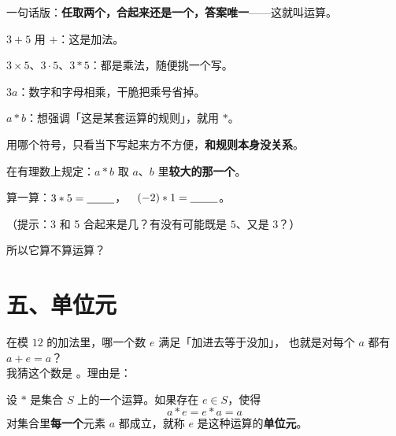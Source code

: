 \noindent 一句话版：\textbf{任取两个，合起来还是一个，答案唯一}——这就叫运算。

\begin{example}
  \(3+5\) 用 \(+\)：这是加法。

  \(3\times5\)、\(3\cdot5\)、\(3*5\)：都是乘法，随便挑一个写。

  \(3a\)：数字和字母相乘，干脆把乘号省掉。

  \(a*b\)：想强调「这是某套运算的规则」，就用 \(*\)。

  用哪个符号，只看当下写起来方不方便，\textbf{和规则本身没关系}。
\end{example}

\begin{sikao}
  在有理数上规定：\(a*b\) 取 \(a\)、\(b\) 里\textbf{较大的那一个}。

  算一算：\(3*5=\underline{\hspace{2.5em}}\)，\(\quad(-2)*1=\underline{\hspace{2.5em}}\)。

  （提示：3 和 5 合起来是几？有没有可能既是 \(5\)、又是 \(3\)？）

  所以它算不算运算？\underline{\hspace{4em}}
\end{sikao}

\section*{五、单位元}

\begin{sikao}
  在模 \(12\) 的加法里，哪一个数 \(e\) 满足「加进去等于没加」，
  也就是对每个 \(a\) 都有 \(a+e=a\)？\\[4pt]
  我猜这个数是 \underline{\hspace{4em}}。理由是：
\end{sikao}

\begin{definition}[单位元]
  设 \(*\) 是集合 \(S\) 上的一个运算。如果存在 \(e\in S\)，使得
  \[
    a*e=e*a=a
  \]
  对集合里\textbf{每一个}元素 \(a\) 都成立，就称 \(e\) 是这种运算的\textbf{单位元}。
\end{definition}

